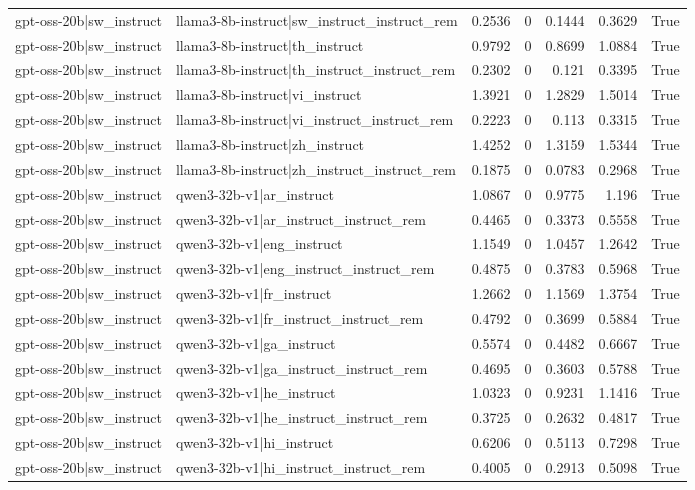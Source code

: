 \begin{table}
\begin{tabular}{l l r r r r l}
gpt-oss-20b|sw_instruct & llama3-8b-instruct|sw_instruct_instruct_rem & 0.2536 & 0 & 0.1444 & 0.3629 & True \\
gpt-oss-20b|sw_instruct & llama3-8b-instruct|th_instruct & 0.9792 & 0 & 0.8699 & 1.0884 & True \\
gpt-oss-20b|sw_instruct & llama3-8b-instruct|th_instruct_instruct_rem & 0.2302 & 0 & 0.121 & 0.3395 & True \\
gpt-oss-20b|sw_instruct & llama3-8b-instruct|vi_instruct & 1.3921 & 0 & 1.2829 & 1.5014 & True \\
gpt-oss-20b|sw_instruct & llama3-8b-instruct|vi_instruct_instruct_rem & 0.2223 & 0 & 0.113 & 0.3315 & True \\
gpt-oss-20b|sw_instruct & llama3-8b-instruct|zh_instruct & 1.4252 & 0 & 1.3159 & 1.5344 & True \\
gpt-oss-20b|sw_instruct & llama3-8b-instruct|zh_instruct_instruct_rem & 0.1875 & 0 & 0.0783 & 0.2968 & True \\
gpt-oss-20b|sw_instruct & qwen3-32b-v1|ar_instruct & 1.0867 & 0 & 0.9775 & 1.196 & True \\
gpt-oss-20b|sw_instruct & qwen3-32b-v1|ar_instruct_instruct_rem & 0.4465 & 0 & 0.3373 & 0.5558 & True \\
gpt-oss-20b|sw_instruct & qwen3-32b-v1|eng_instruct & 1.1549 & 0 & 1.0457 & 1.2642 & True \\
gpt-oss-20b|sw_instruct & qwen3-32b-v1|eng_instruct_instruct_rem & 0.4875 & 0 & 0.3783 & 0.5968 & True \\
gpt-oss-20b|sw_instruct & qwen3-32b-v1|fr_instruct & 1.2662 & 0 & 1.1569 & 1.3754 & True \\
gpt-oss-20b|sw_instruct & qwen3-32b-v1|fr_instruct_instruct_rem & 0.4792 & 0 & 0.3699 & 0.5884 & True \\
gpt-oss-20b|sw_instruct & qwen3-32b-v1|ga_instruct & 0.5574 & 0 & 0.4482 & 0.6667 & True \\
gpt-oss-20b|sw_instruct & qwen3-32b-v1|ga_instruct_instruct_rem & 0.4695 & 0 & 0.3603 & 0.5788 & True \\
gpt-oss-20b|sw_instruct & qwen3-32b-v1|he_instruct & 1.0323 & 0 & 0.9231 & 1.1416 & True \\
gpt-oss-20b|sw_instruct & qwen3-32b-v1|he_instruct_instruct_rem & 0.3725 & 0 & 0.2632 & 0.4817 & True \\
gpt-oss-20b|sw_instruct & qwen3-32b-v1|hi_instruct & 0.6206 & 0 & 0.5113 & 0.7298 & True \\
gpt-oss-20b|sw_instruct & qwen3-32b-v1|hi_instruct_instruct_rem & 0.4005 & 0 & 0.2913 & 0.5098 & True \\

\end{tabular}
\end{table}

